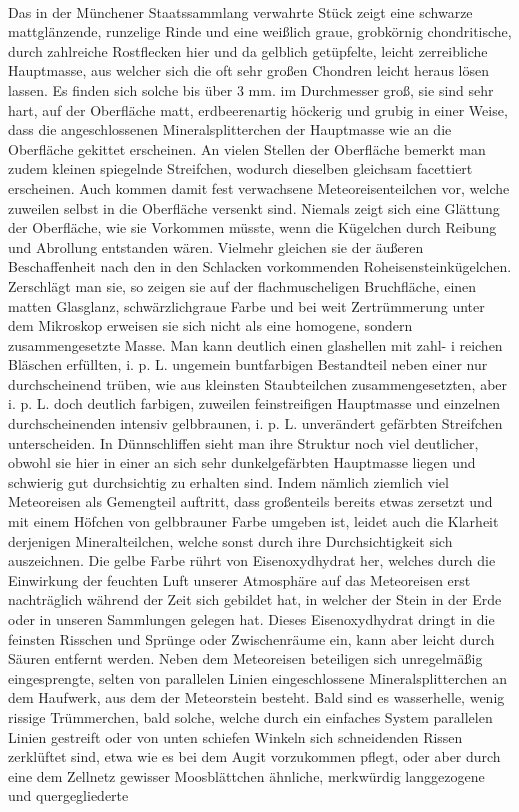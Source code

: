 \documentclass[a4paper, 11pt, oneside]{article}
\begin{document}
\paragraph{}
Das in der Münchener Staatssammlang verwahrte Stück zeigt eine schwarze mattglänzende, runzelige Rinde und eine weißlich graue, grobkörnig chondritische, durch zahlreiche Rostflecken hier und da gelblich getüpfelte, leicht zerreibliche Hauptmasse, aus welcher sich die oft sehr großen Chondren leicht heraus lösen lassen. Es finden sich solche bis über 3 mm. im Durchmesser groß, sie sind sehr hart, auf der Oberfläche matt, erdbeerenartig höckerig und grubig in einer Weise, dass die angeschlossenen Mineralsplitterchen der Hauptmasse wie an die Oberfläche gekittet erscheinen. An vielen Stellen der Oberfläche bemerkt man zudem kleinen spiegelnde Streifchen, wodurch dieselben gleichsam facettiert erscheinen. Auch kommen damit fest verwachsene Meteoreisenteilchen vor, welche zuweilen selbst in die Oberfläche versenkt sind. Niemals zeigt sich eine Glättung der Oberfläche, wie sie Vorkommen müsste, wenn die Kügelchen durch Reibung und Abrollung entstanden wären. Vielmehr gleichen sie der äußeren Beschaffenheit nach den in den Schlacken vorkommenden Roheisensteinkügelchen. Zerschlägt man sie, so zeigen sie auf der flachmuscheligen Bruchfläche, einen matten Glasglanz, schwärzlichgraue Farbe und bei weit Zertrümmerung unter dem Mikroskop erweisen sie sich nicht als eine homogene, sondern zusammengesetzte Masse. Man kann deutlich einen glashellen mit zahl- i reichen Bläschen erfüllten, i. p. L. ungemein buntfarbigen Bestandteil neben einer nur durchscheinend trüben, wie aus kleinsten Staubteilchen zusammengesetzten, aber i. p. L. doch deutlich farbigen, zuweilen feinstreifigen Hauptmasse und einzelnen durchscheinenden intensiv gelbbraunen, i. p. L. unverändert gefärbten Streifchen unterscheiden. In Dünnschliffen sieht man ihre Struktur noch viel deutlicher, obwohl sie hier in einer an sich sehr dunkelgefärbten Hauptmasse liegen und schwierig gut durchsichtig zu erhalten sind. Indem nämlich ziemlich viel Meteoreisen als Gemengteil auftritt, dass großenteils bereits etwas zersetzt und mit einem Höfchen von gelbbrauner Farbe umgeben ist, leidet auch die Klarheit derjenigen Mineralteilchen, welche sonst durch ihre Durchsichtigkeit sich auszeichnen. Die gelbe Farbe rührt von Eisenoxydhydrat her, welches durch die Einwirkung der feuchten Luft unserer Atmosphäre auf das Meteoreisen erst nachträglich während der Zeit sich gebildet hat, in welcher der Stein in der Erde oder in unseren Sammlungen gelegen hat. Dieses Eisenoxydhydrat dringt in die feinsten Risschen und Sprünge oder Zwischenräume ein, kann aber leicht durch Säuren entfernt werden. Neben dem Meteoreisen beteiligen sich unregelmäßig eingesprengte, selten von parallelen Linien eingeschlossene Mineralsplitterchen an dem Haufwerk, aus dem der Meteorstein besteht. Bald sind es wasserhelle, wenig rissige Trümmerchen, bald solche, welche durch ein einfaches System parallelen Linien gestreift oder von unten schiefen Winkeln sich schneidenden Rissen zerklüftet sind, etwa wie es bei dem Augit vorzukommen pflegt, oder aber durch eine dem Zellnetz gewisser Moosblättchen ähnliche, merkwürdig langgezogene und quergegliederte 
\end{document}
